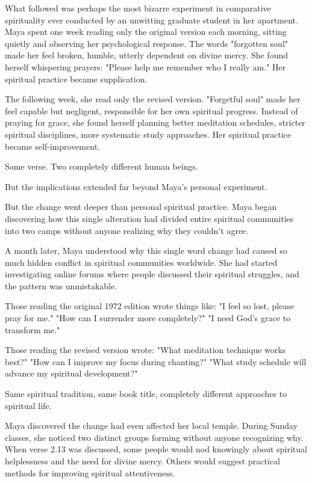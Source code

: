 \documentclass[11pt,twoside]{book}
\begin{document}
What followed was perhaps the most bizarre experiment in comparative spirituality ever conducted by an unwitting graduate student in her apartment. Maya spent one week reading only the original version each morning, sitting quietly and observing her psychological response. The words "forgotten soul" made her feel broken, humble, utterly dependent on divine mercy. She found herself whispering prayers: "Please help me remember who I really am." Her spiritual practice became supplication.

The following week, she read only the revised version. "Forgetful soul" made her feel capable but negligent, responsible for her own spiritual progress. Instead of praying for grace, she found herself planning better meditation schedules, stricter spiritual disciplines, more systematic study approaches. Her spiritual practice became self-improvement.

Same verse. Two completely different human beings.

But the implications extended far beyond Maya's personal experiment.

But the change went deeper than personal spiritual practice. Maya began discovering how this single alteration had divided entire spiritual communities into two camps without anyone realizing why they couldn't agree.

A month later, Maya understood why this single word change had caused so much hidden conflict in spiritual communities worldwide. She had started investigating online forums where people discussed their spiritual struggles, and the pattern was unmistakable.

Those reading the original 1972 edition wrote things like: "I feel so lost, please pray for me." "How can I surrender more completely?" "I need God's grace to transform me."

Those reading the revised version wrote: "What meditation technique works best?" "How can I improve my focus during chanting?" "What study schedule will advance my spiritual development?"

Same spiritual tradition, same book title, completely different approaches to spiritual life.

Maya discovered the change had even affected her local temple. During Sunday classes, she noticed two distinct groups forming without anyone recognizing why. When verse 2.13 was discussed, some people would nod knowingly about spiritual helplessness and the need for divine mercy. Others would suggest practical methods for improving spiritual attentiveness.
\end{document}
